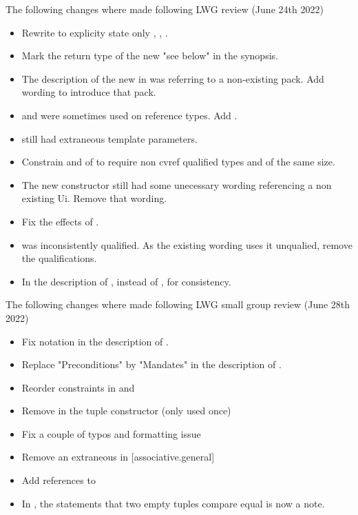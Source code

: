 \documentclass{wg21}
\begin{document}
The following changes where made following LWG review (June 24th 2022)

\begin{itemize}
\item Rewrite  to explicity state only , , .
\item Mark the return type of the new  "see below" in the synopsis.
\item The description of the new  in  was referring to a non-existing pack. Add wording to introduce that pack.
\item {} and  were sometimes used on reference types. Add .
\item {} still had extraneous template parameters.
\item Constrain  and  of  to require
non cvref qualified types and  of the same size.
\item The new  constructor still had some unecessary wording referencing a non existing Ui.
Remove that wording.
\item Fix the effects of .
\item {} was inconsistently qualified. As the existing wording uses it unqualied,
remove the qualifications.
\item In the description of ,  instead of  ,
for consistency.
\end{itemize}

The following changes where made following LWG small group review (June 28th 2022)

\begin{itemize}
\item Fix notation in the description of .
\item Replace "Preconditions" by "Mandates" in the description of .
\item Reorder constraints in  and 
\item Remove  in the tuple constructor (only used once)
\item Fix a couple of typos and formatting issue
\item Remove an extraneous \tcode{>} in [associative.general]
\item Add references to 
\item In , the statements that two empty tuples compare equal is now a note.
\end{itemize}
\end{document}
